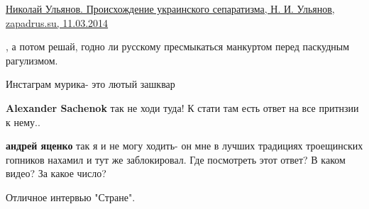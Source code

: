 \begin{itemize}
\begin{itemize}
\href{https://zapadrus.su/bibli/istfbid/979-nikolaj-ulyanov-proiskhozhdenie-ukrainskogo-separatizma.html}{%
Николай Ульянов. Происхождение украинского сепаратизма, Н. И. Ульянов, zapadrus.su, 11.03.2014%
}

, а потом решай, годно ли русскому пресмыкаться манкуртом перед паскудным
рагулизмом.

\end{itemize}

 
Инстаграм мурика- это лютый зашквар

\begin{itemize}
 
\textbf{Alexander Sachenok} так не ходи туда! К стати там есть ответ на все притнзии к нему..

 
\textbf{андрей яценко} так я и не могу ходить- он мне в лучших традициях троещинских гопников нахамил и тут же заблокировал.
Где посмотреть этот ответ? В каком видео? За какое число?
\end{itemize}

 
Отличное интервью "Стране".

\begin{itemize}
 

\end{itemize}
\end{itemize}
